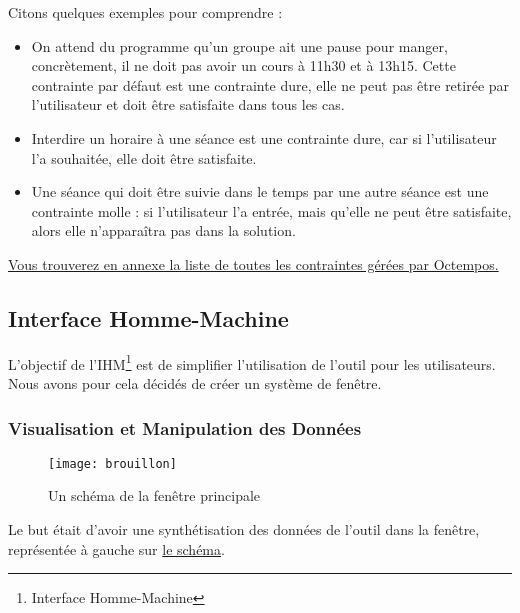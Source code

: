 \documentclass[12pt,a4paper]{article}
\begin{document}
Citons quelques exemples pour comprendre :

\begin{itemize}[label=\textbullet]
\item On attend du programme qu'un groupe ait une pause pour manger, concrètement, il ne doit pas avoir un cours à 11h30 et à 13h15. Cette contrainte par défaut est une contrainte dure, elle ne peut pas être retirée par l'utilisateur et doit être satisfaite dans tous les cas.

\item Interdire un horaire à une séance est une contrainte dure, car si l'utilisateur l'a souhaitée, elle doit être satisfaite.

\item Une séance qui doit être suivie dans le temps par une autre séance est une contrainte molle : si l'utilisateur l'a entrée, mais qu'elle ne peut être satisfaite, alors elle n'apparaîtra pas dans la solution.
\end{itemize}

\hyperref[listContraintes]{Vous trouverez en annexe la liste de toutes les contraintes gérées par Octempos.}

\subsection{Interface Homme-Machine}

L’objectif de l’IHM\footnote{Interface Homme-Machine} est de simplifier l’utilisation de l'outil pour les utilisateurs. Nous avons pour cela décidés de créer un système de fenêtre.

\subsubsection{Visualisation et Manipulation des Données}
\begin{wrapfigure}{l}{0.5\textwidth} 
    \label{brouillon}
    \centering
    \texttt{[image: brouillon]}
    \caption{Un schéma de la fenêtre principale}
\end{wrapfigure}


Le but était d'avoir une synthétisation des données de l'outil dans la fenêtre, représentée à gauche sur \hyperref[brouillon]{le schéma}.
\end{document}
